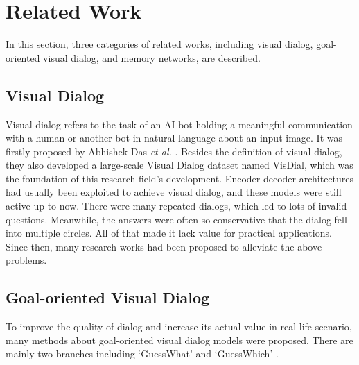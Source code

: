 \documentclass[review]{elsarticle}
\begin{document}
	
	\section{Related Work}In this section, three categories of related works, including visual dialog, goal-oriented visual dialog, and memory networks, are described.
	\subsection{Visual Dialog}
	
	Visual dialog refers to the task of an AI bot holding a meaningful communication with a human or another bot in natural language about an input image. It was firstly proposed by Abhishek Das \textit{et al.} \cite{DBLP:conf/cvpr/DasKGSYMPB17}. Besides the definition of visual dialog, they also developed a large-scale Visual Dialog dataset named VisDial, which was the foundation of this research field's development.
	Encoder-decoder architectures had usually been exploited to achieve visual dialog, and these models were still active up to now. There were many repeated dialogs, which led to lots of invalid questions. Meanwhile, the answers were often so conservative that the dialog fell into multiple circles. 
	All of that made it lack value for practical applications. Since then, many research works had been proposed to alleviate the above problems.
	
	\subsection{Goal-oriented Visual Dialog}
	To improve the quality of dialog and increase its actual value in real-life scenario, many methods \cite{DBLP:conf/cvpr/VriesSCPLC17, DBLP:conf/emnlp/HuWLTXWC18, DBLP:conf/coling/ShekharBVBBF18, DBLP:conf/naacl/ShekharVBBPBF19, abbasnejad2019s, shukla2019should, DBLP:conf/iccv/DasKMLB17, DBLP:conf/nips/LuKYPB17, DBLP:conf/atal/AgarwalGSLS19, DBLP:conf/sigdial/ZhangZY18, DBLP:conf/emnlp/MurahariCBPD19} about goal-oriented visual dialog models were proposed. 
	There are mainly two branches including `GuessWhat' \cite{DBLP:conf/cvpr/VriesSCPLC17, DBLP:conf/emnlp/HuWLTXWC18, DBLP:conf/coling/ShekharBVBBF18, DBLP:conf/naacl/ShekharVBBPBF19, abbasnejad2019s} and `GuessWhich' \cite{shukla2019should, DBLP:conf/iccv/DasKMLB17, DBLP:conf/nips/LuKYPB17, DBLP:conf/atal/AgarwalGSLS19, DBLP:conf/sigdial/ZhangZY18, DBLP:conf/emnlp/MurahariCBPD19}. 
	
\end{document}
